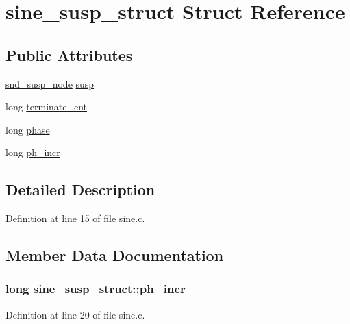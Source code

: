 \hypertarget{structsine__susp__struct}{}\section{sine\+\_\+susp\+\_\+struct Struct Reference}
\label{structsine__susp__struct}
\subsection*{Public Attributes}
\begin{DoxyCompactItemize}
\item 
\hyperlink{sound_8h_a6b268203688a934bd798ceb55f85d4c0}{snd\+\_\+susp\+\_\+node} \hyperlink{structsine__susp__struct_a8777e5359c52e2518dfaae655c5c2bc4}{susp}
\item 
long \hyperlink{structsine__susp__struct_a17bb208fec738e21d949b1d0d2ab9b5b}{terminate\+\_\+cnt}
\item 
long \hyperlink{structsine__susp__struct_aa6d104c552e89347a6e62f55550fb8df}{phase}
\item 
long \hyperlink{structsine__susp__struct_acbe0d83f88d8b7668529f05096e19513}{ph\+\_\+incr}
\end{DoxyCompactItemize}


\subsection{Detailed Description}


Definition at line 15 of file sine.\+c.



\subsection{Member Data Documentation}
\subsubsection[{\texorpdfstring{ph\+\_\+incr}{ph_incr}}]{\setlength{\rightskip}{0pt plus 5cm}long sine\+\_\+susp\+\_\+struct\+::ph\+\_\+incr}\hypertarget{structsine__susp__struct_acbe0d83f88d8b7668529f05096e19513}{}\label{structsine__susp__struct_acbe0d83f88d8b7668529f05096e19513}


Definition at line 20 of file sine.\+c.

